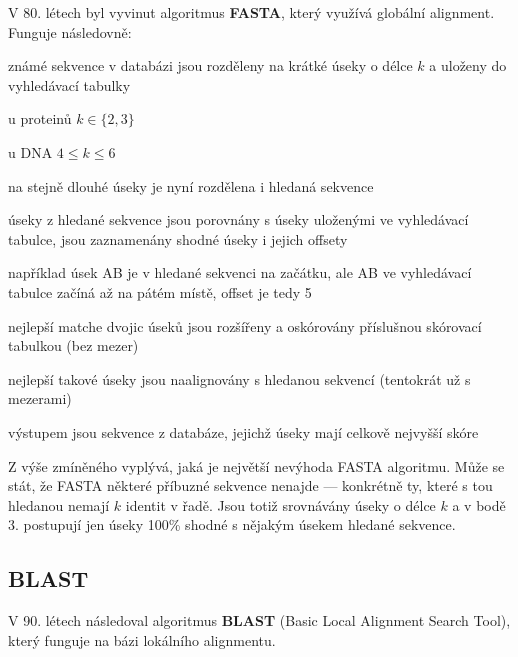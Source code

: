 \documentclass[DIV=8]{scrreprt}
\begin{document}
V 80. létech byl vyvinut algoritmus \textbf{FASTA}, který využívá globální alignment. Funguje následovně:
\begin{myEnumerate}[nosep]
    \item známé sekvence v databázi jsou rozděleny na krátké úseky o délce \(k\) a uloženy do vyhledávací tabulky
\begin{myItemize}[nosep]
    \item u proteinů \(k \in \{2, 3\}\)
    \item u DNA \(4 \leq k \leq 6\)
\end{myItemize}

    \item na stejně dlouhé úseky je nyní rozdělena i hledaná sekvence
    \item úseky z hledané sekvence jsou porovnány s úseky uloženými ve vyhledávací tabulce, jsou zaznamenány shodné úseky i jejich offsety
\begin{myItemize}[nosep]
    \item například úsek AB je v hledané sekvenci na začátku, ale AB ve vyhledávací tabulce začíná až na pátém místě, offset je tedy 5
\end{myItemize}

    \item nejlepší matche dvojic úseků jsou rozšířeny a oskórovány příslušnou skórovací tabulkou (bez mezer)
    \item nejlepší takové úseky jsou naalignovány s hledanou sekvencí (tentokrát už s mezerami)
    \item výstupem jsou sekvence z databáze, jejichž úseky mají celkově nejvyšší skóre
\end{myEnumerate}



Z výše zmíněného vyplývá, jaká je největší nevýhoda FASTA algoritmu. Může se stát, že FASTA některé příbuzné sekvence nenajde --- konkrétně ty, které s tou hledanou nemají \(k\) identit v řadě. Jsou totiž srovnávány úseky o délce \(k\) a v bodě 3. postupují jen úseky 100\% shodné s nějakým úsekem hledané sekvence.

\subsection{BLAST} \label{BLAST}


V 90. létech následoval algoritmus \textbf{BLAST} (Basic Local Alignment Search Tool), který funguje na bázi lokálního alignmentu.
\end{document}
